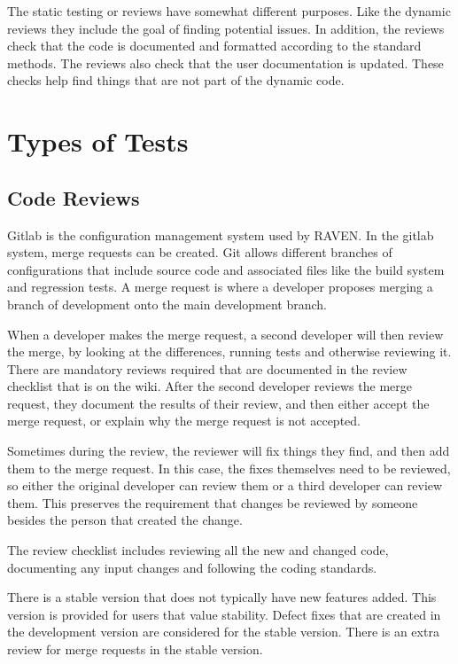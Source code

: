 \documentclass{article}
\begin{document}
The static testing or reviews have somewhat different purposes.  Like
the dynamic reviews they include the goal of finding potential
issues. In addition, the reviews check that the code is documented and
formatted according to the standard methods.  The reviews also check
that the user documentation is updated.  These checks help find things
that are not part of the dynamic code.

\section{Types of Tests}

\subsection{Code Reviews}

Gitlab is the configuration management system used by RAVEN. In the
gitlab system, merge requests can be created.  Git allows different
branches of configurations that include source code and associated
files like the build system and regression tests.  A merge request is
where a developer proposes merging a branch of development onto the
main development branch.

When a developer makes the merge request, a second developer will then
review the merge, by looking at the differences, running tests and
otherwise reviewing it.  There are mandatory reviews required that are
documented in the review checklist that is on the wiki.  After the
second developer reviews the merge request, they document the
results of their review, and then either accept the merge request, or
explain why the merge request is not accepted.

Sometimes during the review, the reviewer will fix things they find,
and then add them to the merge request.  In this case, the fixes
themselves need to be reviewed, so either the original developer can
review them or a third developer can review them.  This preserves the
requirement that changes be reviewed by someone besides the person
that created the change.

The review checklist includes reviewing all the new and changed code,
documenting any input changes and following the coding standards.

There is a stable version that does not typically have new features
added.  This version is provided for users that value stability.
Defect fixes that are created in the development version are
considered for the stable version.  There is an extra review for merge
requests in the stable version.
\end{document}
